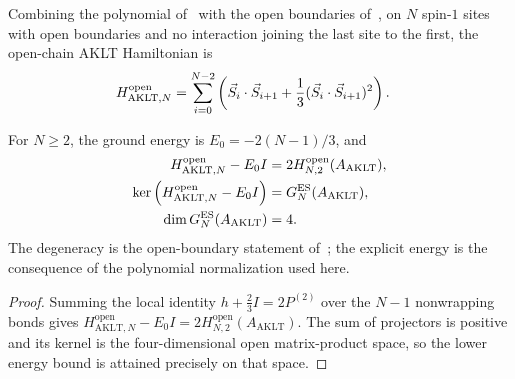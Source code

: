 \begin{definition}%
    \label{def:aklt_open_polynomial_hamiltonian}
    \leanok
    Combining the polynomial of~\cite[local TeX lines~340--349]{PerezGarcia2007Matrix}
    with the open boundaries of~\cite[lines~1171--1174]{Cirac2021Matrix}, on
    $N$ spin-$1$ sites with open boundaries and no interaction joining the
    last site to the first, the open-chain AKLT Hamiltonian is
    \begin{align}
        H^{\mathrm{open}}_{\mathrm{AKLT},N}
         & =\sum_{i=0}^{N-2}\left(\vec S_i\cdot\vec S_{i+1}
        +\frac13(\vec S_i\cdot\vec S_{i+1})^2\right).
        \notag
    \end{align}
\end{definition}

\begin{lemma}%
    \label{thm:aklt_open_polynomial_ground_space}
    \leanok
    For $N\ge2$, the ground energy is $E_0=-2(N-1)/3$, and
    \begin{align}
        H^{\mathrm{open}}_{\mathrm{AKLT},N}-E_0I
         & =2H^{\mathrm{open}}_{N,2}(A_{\mathrm{AKLT}}),\notag \\
        \ker\left(H^{\mathrm{open}}_{\mathrm{AKLT},N}-E_0I\right)
         & =G_N^{\mathrm{ES}}(A_{\mathrm{AKLT}}),\notag        \\
        \dim G_N^{\mathrm{ES}}(A_{\mathrm{AKLT}})
         & =4.\notag
    \end{align}
    The degeneracy is the open-boundary statement
    of~\cite[lines~1171--1174]{Cirac2021Matrix}; the explicit energy is
    the consequence of the polynomial normalization used here.
\end{lemma}
\begin{proof}\leanok
    Summing the local identity $h+\frac23I=2P^{(2)}$ over the $N-1$
    nonwrapping bonds gives
    $H^{\mathrm{open}}_{\mathrm{AKLT},N}-E_0I=2H^{\mathrm{open}}_{N,2}(A_{\mathrm{AKLT}})$.
    The sum of projectors is positive and its kernel
    is the four-dimensional open matrix-product space, so the lower
    energy bound is attained precisely on that space.
\end{proof}

